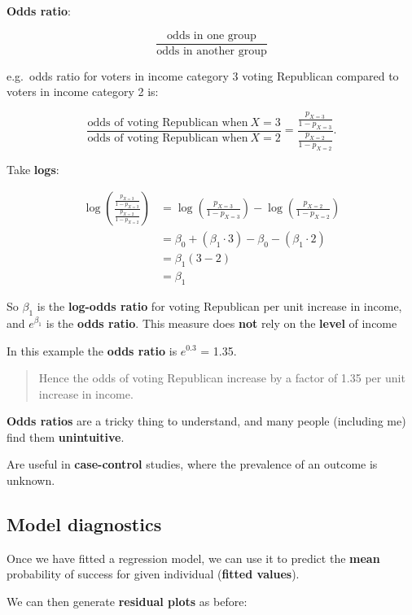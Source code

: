 \documentclass[]{book}
\theoremstyle{definition}
\theoremstyle{definition}
\theoremstyle{definition}
\theoremstyle{remark}
\begin{document}
\textbf{Odds ratio}:

\[
    \frac{\mbox{odds in one group}}{\mbox{odds in another group}}
\]

e.g.~odds ratio for voters in income category 3 voting Republican
compared to voters in income category 2 is:

\[
    \frac{\mbox{odds of voting Republican when}~X = 3}{\mbox{odds of voting Republican when}~X = 2} = \frac{\frac{p_{X = 3}}{1 - p_{X = 3}}}{\frac{p_{X = 2}}{1 - p_{X = 2}}}.
\]

Take \textbf{logs}:

\[
    \begin{aligned}
    \log\left(\frac{\frac{p_{X = 3}}{1 - p_{X = 3}}}{\frac{p_{X = 2}}{1 - p_{X = 2}}}\right) &= \log\left(\frac{p_{X = 3}}{1 - p_{X = 3}}\right) - \log\left(\frac{p_{X = 2}}{1 - p_{X = 2}}\right)\\
    &= \beta_0 + \left(\beta_1 \cdot 3\right) - \beta_0 - \left(\beta_1 \cdot 2\right)\\
    &= \beta_1 (3 - 2)\\
    &= \beta_1
    \end{aligned}
\]

So \(\beta_1\) is the \textbf{log-odds ratio} for voting Republican per
unit increase in income, and \(e^{\beta_1}\) is the \textbf{odds ratio}.
This measure does \textbf{not} rely on the \textbf{level} of income

In this example the \textbf{odds ratio} is \(e^{0.3}\) = 1.35.

\begin{quote}
Hence the odds of voting Republican increase by a factor of 1.35 per
unit increase in income.
\end{quote}

\textbf{Odds ratios} are a tricky thing to understand, and many people
(including me) find them \textbf{unintuitive}.

Are useful in \textbf{case-control} studies, where the prevalence of an
outcome is unknown.

\subsection{Model diagnostics}\label{model-diagnostics}

Once we have fitted a regression model, we can use it to predict the
\textbf{mean} probability of success for given individual
(\textbf{fitted values}).

We can then generate \textbf{residual plots} as before:
\end{document}
